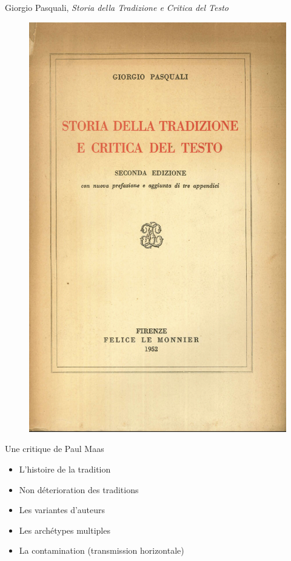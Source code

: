 \documentclass[11pt]{beamer}
\begin{document}
\begin{frame}{Giorgio Pasquali, \textit{Storia della Tradizione e Critica del Testo}}
\begin{minipage}{.4\textwidth}
    \begin{figure}
    \centering
    \includegraphics[width=1\linewidth]{img/pasquali.png}
    \end{figure} 
    \end{minipage}%
    \hfill
\begin{minipage}{.6\textwidth}
    \begin{block}{Une critique de Paul Maas}
     \begin{itemize}
        \item L'histoire de la tradition
        \item Non déterioration des traditions
        \item Les variantes d'auteurs
        \item Les archétypes multiples
        \item La contamination (transmission horizontale)

    \end{itemize}
    \end{block}
    \end{minipage}
    
\end{frame}
\end{document}
